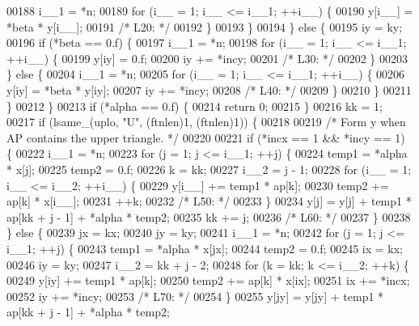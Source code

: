 \begin{DoxyCode}
00188         i\_\_1 = *n;
00189         \textcolor{keywordflow}{for} (i\_\_ = 1; i\_\_ <= i\_\_1; ++i\_\_) \{
00190             y[i\_\_] = *beta * y[i\_\_];
00191 \textcolor{comment}{/* L20: */}
00192         \}
00193         \}
00194     \} \textcolor{keywordflow}{else} \{
00195         iy = ky;
00196         \textcolor{keywordflow}{if} (*beta == 0.f) \{
00197         i\_\_1 = *n;
00198         \textcolor{keywordflow}{for} (i\_\_ = 1; i\_\_ <= i\_\_1; ++i\_\_) \{
00199             y[iy] = 0.f;
00200             iy += *incy;
00201 \textcolor{comment}{/* L30: */}
00202         \}
00203         \} \textcolor{keywordflow}{else} \{
00204         i\_\_1 = *n;
00205         \textcolor{keywordflow}{for} (i\_\_ = 1; i\_\_ <= i\_\_1; ++i\_\_) \{
00206             y[iy] = *beta * y[iy];
00207             iy += *incy;
00208 \textcolor{comment}{/* L40: */}
00209         \}
00210         \}
00211     \}
00212     \}
00213     \textcolor{keywordflow}{if} (*alpha == 0.f) \{
00214     \textcolor{keywordflow}{return} 0;
00215     \}
00216     kk = 1;
00217     \textcolor{keywordflow}{if} (lsame\_(uplo, \textcolor{stringliteral}{"U"}, (ftnlen)1, (ftnlen)1)) \{
00218 
00219 \textcolor{comment}{/*        Form  y  when AP contains the upper triangle. */}
00220 
00221     \textcolor{keywordflow}{if} (*incx == 1 && *incy == 1) \{
00222         i\_\_1 = *n;
00223         \textcolor{keywordflow}{for} (j = 1; j <= i\_\_1; ++j) \{
00224         temp1 = *alpha * x[j];
00225         temp2 = 0.f;
00226         k = kk;
00227         i\_\_2 = j - 1;
00228         \textcolor{keywordflow}{for} (i\_\_ = 1; i\_\_ <= i\_\_2; ++i\_\_) \{
00229             y[i\_\_] += temp1 * ap[k];
00230             temp2 += ap[k] * x[i\_\_];
00231             ++k;
00232 \textcolor{comment}{/* L50: */}
00233         \}
00234         y[j] = y[j] + temp1 * ap[kk + j - 1] + *alpha * temp2;
00235         kk += j;
00236 \textcolor{comment}{/* L60: */}
00237         \}
00238     \} \textcolor{keywordflow}{else} \{
00239         jx = kx;
00240         jy = ky;
00241         i\_\_1 = *n;
00242         \textcolor{keywordflow}{for} (j = 1; j <= i\_\_1; ++j) \{
00243         temp1 = *alpha * x[jx];
00244         temp2 = 0.f;
00245         ix = kx;
00246         iy = ky;
00247         i\_\_2 = kk + j - 2;
00248         \textcolor{keywordflow}{for} (k = kk; k <= i\_\_2; ++k) \{
00249             y[iy] += temp1 * ap[k];
00250             temp2 += ap[k] * x[ix];
00251             ix += *incx;
00252             iy += *incy;
00253 \textcolor{comment}{/* L70: */}
00254         \}
00255         y[jy] = y[jy] + temp1 * ap[kk + j - 1] + *alpha * temp2;

\end{DoxyCode}
